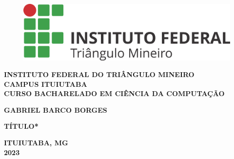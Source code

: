 \thispagestyle{empty}

\begin{figure}
	\centering
	\includegraphics[scale=0.3]{pre-textuais/Horizontal_resumida.png}
\end{figure}

\begin{center}
\textbf{INSTITUTO FEDERAL DO TRIÂNGULO MINEIRO\\ CAMPUS ITUIUTABA\\CURSO BACHARELADO EM CIÊNCIA DA COMPUTAÇÃO}\\

\vspace*{3 cm}

\textbf{GABRIEL BARCO BORGES}\\

\vspace*{5 cm}

\textbf{\large{TÍTULO*}}

\vspace*{8 cm}

\textbf{ITUIUTABA, MG\\2023}
\end{center}